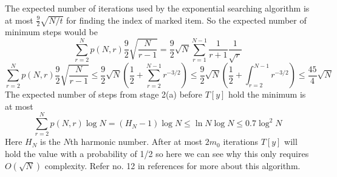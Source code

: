 \documentclass{report}
\begin{document}
The expected number of iterations used by the exponential searching algorithm is at most $\frac{9}{2}\sqrt{N/t}$ for finding the index of marked item. So the expected number of minimum steps would be
$$\sum_{r=2}^{N}p(N,r)\dfrac{9}{2}\sqrt{\dfrac{N}{r-1}} = \dfrac{9}{2}\sqrt{N}\sum_{r=1}^{N-1}\dfrac{1}{r+1}\dfrac{1}{\sqrt{r}}$$
$$\sum_{r=2}^{N}p(N,r)\dfrac{9}{2}\sqrt{\dfrac{N}{r-1}} \leq \dfrac{9}{2}\sqrt{N}\left(\dfrac{1}{2} + \sum_{r=2}^{N-1}r^{-3/2}\right) \leq \dfrac{9}{2}\sqrt{N}\left(\dfrac{1}{2} + \int_{r=2}^{N-1}r^{-3/2}\right) \leq \dfrac{45}{4}\sqrt{N}$$
The expected number of steps from stage 2(a) before $T[y]$ hold the minimum is at most
$$\sum_{r=2}^{N}p(N,r)\log{N} = (H_N - 1)\log{N} \leq \ln{N}\log{N} \leq 0.7\log^2N$$
Here $H_N$ is the $N$th harmonic number. After at most $2m_0$ iterations $T[y]$ will hold the value with a probability of 1/2 so here we can see why this only requires $O(\sqrt{N})$ complexity. Refer no. 12 in references for more about this algorithm.
\end{document}
